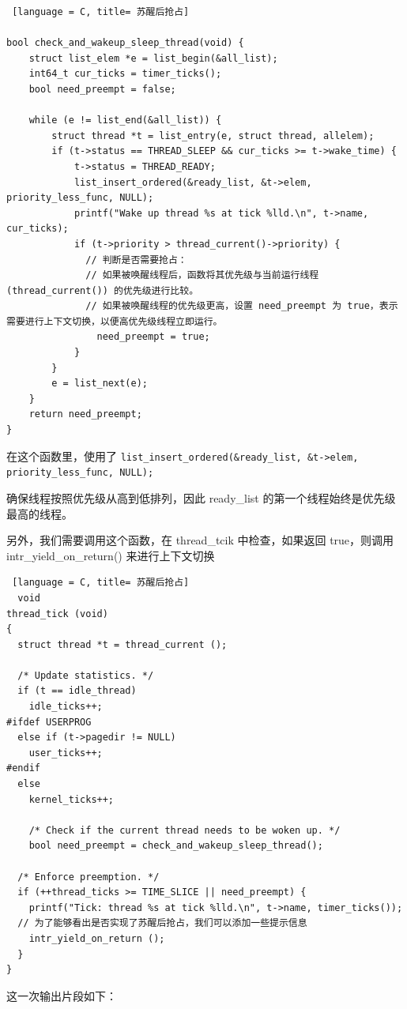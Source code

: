 \begin{lstlisting} [language = C, title= 苏醒后抢占]

bool check_and_wakeup_sleep_thread(void) {
    struct list_elem *e = list_begin(&all_list);
    int64_t cur_ticks = timer_ticks();
    bool need_preempt = false;

    while (e != list_end(&all_list)) {
        struct thread *t = list_entry(e, struct thread, allelem);
        if (t->status == THREAD_SLEEP && cur_ticks >= t->wake_time) {
            t->status = THREAD_READY;
            list_insert_ordered(&ready_list, &t->elem, priority_less_func, NULL);
            printf("Wake up thread %s at tick %lld.\n", t->name, cur_ticks);
            if (t->priority > thread_current()->priority) {
              // 判断是否需要抢占：
              // 如果被唤醒线程后，函数将其优先级与当前运行线程 (thread_current()) 的优先级进行比较。
              // 如果被唤醒线程的优先级更高，设置 need_preempt 为 true，表示需要进行上下文切换，以便高优先级线程立即运行。
                need_preempt = true;
            }
        }
        e = list_next(e);
    }
    return need_preempt;
}

\end{lstlisting}

在这个函数里，使用了 \texttt{list\_insert\_ordered(\&ready\_list, \&t->elem, priority\_less\_func, NULL);}

确保线程按照优先级从高到低排列，因此 ready\_list 的第一个线程始终是优先级最高的线程。

另外，我们需要调用这个函数，在 thread\_tcik 中检查，如果返回 true，则调用 intr\_yield\_on\_return() 来进行上下文切换
\begin{lstlisting} [language = C, title= 苏醒后抢占]
  void
thread_tick (void)
{
  struct thread *t = thread_current ();

  /* Update statistics. */
  if (t == idle_thread)
    idle_ticks++;
#ifdef USERPROG
  else if (t->pagedir != NULL)
    user_ticks++;
#endif
  else
    kernel_ticks++;

	/* Check if the current thread needs to be woken up. */
	bool need_preempt = check_and_wakeup_sleep_thread();

  /* Enforce preemption. */
  if (++thread_ticks >= TIME_SLICE || need_preempt) {
	printf("Tick: thread %s at tick %lld.\n", t->name, timer_ticks());
  // 为了能够看出是否实现了苏醒后抢占，我们可以添加一些提示信息
    intr_yield_on_return ();
  }
}
\end{lstlisting}

这一次输出片段如下：

